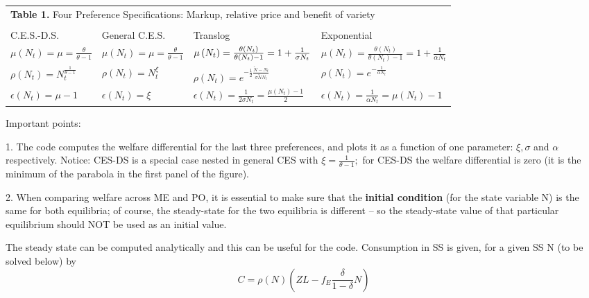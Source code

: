 \documentclass{article}
\begin{document}
\begin{tabular}{llll}
\multicolumn{4}{l}{\textbf{Table 1.} Four Preference Specifications: Markup,
relative price and benefit of variety} \\ 
\multicolumn{4}{l}{} \\ \hline\hline
C.E.S.-D.S. & General C.E.S. & Translog & Exponential \\ \hline
$\mu \left( N_{t}\right) =\mu =\frac{\theta }{\theta -1}$ & $\mu \left(
N_{t}\right) =\mu =\frac{\theta }{\theta -1}$ & $\mu \left( N_{t}\right) =%
\frac{\theta \left( N_{t}\right) }{\theta \left( N_{t}\right) -1}=1+\frac{1}{%
\sigma N_{t}}$ & $\mu \left( N_{t}\right) =\frac{\theta \left( N_{t}\right) 
}{\theta \left( N_{t}\right) -1}=1+\frac{1}{\alpha N_{t}}$ \\ \hline
$\rho \left( N_{t}\right) =N_{t}^{\frac{1}{\theta -1}}$ & $\rho \left(
N_{t}\right) =N_{t}^{\xi }$ & $\rho \left( N_{t}\right) =e^{-\frac{1}{2}%
\frac{\tilde{N}-N_{t}}{\sigma \tilde{N}N_{t}}}$ \ \  & $\rho \left(
N_{t}\right) =e^{-\frac{1}{\alpha N_{t}}}$ \\ \hline
$\epsilon \left( N_{t}\right) =\mu -1$ & $\epsilon \left( N_{t}\right) =\xi $
& $\epsilon \left( N_{t}\right) =\frac{1}{2\sigma N_{t}}=\frac{\mu \left(
N_{t}\right) -1}{2}$ & $\epsilon \left( N_{t}\right) =\frac{1}{\alpha N_{t}}%
=\mu \left( N_{t}\right) -1$ \\ \hline
\end{tabular}

Important points:

1. The code computes the welfare differential for the last three
preferences, and plots it as a function of one parameter: $\xi ,\sigma $ and 
$\alpha $ respectively. Notice: CES-DS is a special case nested in general
CES with $\xi =\frac{1}{\theta -1};$ for CES-DS the welfare differential is
zero (it is the minimum of the parabola in the first panel of the figure).

2. When comparing welfare across ME and PO, it is essential to make sure
that the \textbf{initial condition} (for the state variable N) is the same
for both equilibria; of course, the steady-state for the two equilibria is
different -- so the steady-state value of that particular equilibrium should
NOT be used as an initial value.

The steady state can be computed analytically and this can be useful for the
code. Consumption in SS is given, for a given SS N (to be solved below) by 
\[
C=\rho \left( N\right) \left( ZL-f_{E}\frac{\delta }{1-\delta }N\right) 
\]
\end{document}
